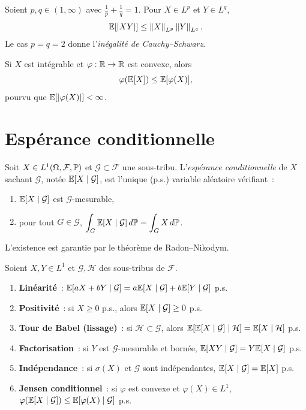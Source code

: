 \begin{theoreme}
Soient $p, q \in (1, \infty)$ avec $\frac{1}{p} + \frac{1}{q} = 1$. Pour
$X \in L^p$ et $Y \in L^q$,
\[
  \mathbb{E}[\left| XY \right|] \leq \left\| X \right\|_{L^p} \left\| Y \right\|_{L^q}.
\]
Le cas $p = q = 2$ donne l'\emph{in\'egalit\'e de Cauchy--Schwarz}.
\end{theoreme}

\begin{theoreme}
\label{thm:jensen}
Si $X$ est int\'egrable et $\varphi : \mathbb{R} \to \mathbb{R}$ est convexe, alors
\[
  \varphi(\mathbb{E}[X]) \leq \mathbb{E}[\varphi(X)],
\]
pourvu que $\mathbb{E}[\left| \varphi(X) \right|] < \infty$.
\end{theoreme}

\section{Esp\'erance conditionnelle}

\begin{definition}
\label{def:esp_cond}
Soit $X \in L^1(\Omega, \mathcal{F}, \mathbb{P})$ et $\mathcal{G} \subset \mathcal{F}$
une sous-tribu. L'\emph{esp\'erance conditionnelle} de $X$ sachant $\mathcal{G}$,
not\'ee $\mathbb{E}[X \mid \mathcal{G}]$, est l'unique (p.s.) variable al\'eatoire v\'erifiant~:
\begin{enumerate}
  \item $\mathbb{E}[X \mid \mathcal{G}]$ est $\mathcal{G}$-mesurable,
  \item pour tout $G \in \mathcal{G}$, $\displaystyle \int_G \mathbb{E}[X \mid \mathcal{G}] \, d\mathbb{P}
    = \int_G X \, d\mathbb{P}$.
\end{enumerate}
L'existence est garantie par le th\'eor\`eme de Radon--Nikodym.
\end{definition}

\begin{theoreme}
\label{thm:prop_ec}
Soient $X, Y \in L^1$ et $\mathcal{G}, \mathcal{H}$ des sous-tribus de $\mathcal{F}$.
\begin{enumerate}
  \item \textbf{Lin\'earit\'e}~: $\mathbb{E}[aX + bY \mid \mathcal{G}] = a\mathbb{E}[X \mid \mathcal{G}]
    + b\mathbb{E}[Y \mid \mathcal{G}]$ p.s.
  \item \textbf{Positivit\'e}~: si $X \geq 0$ p.s., alors $\mathbb{E}[X \mid \mathcal{G}] \geq 0$ p.s.
  \item \textbf{Tour de Babel (lissage)}~: si $\mathcal{H} \subset \mathcal{G}$,
    alors $\mathbb{E}[\mathbb{E}[X \mid \mathcal{G}] \mid \mathcal{H}] = \mathbb{E}[X \mid \mathcal{H}]$ p.s.
  \item \textbf{Factorisation}~: si $Y$ est $\mathcal{G}$-mesurable et born\'ee,
    $\mathbb{E}[XY \mid \mathcal{G}] = Y \mathbb{E}[X \mid \mathcal{G}]$ p.s.
  \item \textbf{Ind\'ependance}~: si $\sigma(X)$ et $\mathcal{G}$ sont ind\'ependantes,
    $\mathbb{E}[X \mid \mathcal{G}] = \mathbb{E}[X]$ p.s.
  \item \textbf{Jensen conditionnel}~: si $\varphi$ est convexe et $\varphi(X) \in L^1$,
    $\varphi(\mathbb{E}[X \mid \mathcal{G}]) \leq \mathbb{E}[\varphi(X) \mid \mathcal{G}]$ p.s.
\end{enumerate}
\end{theoreme}

